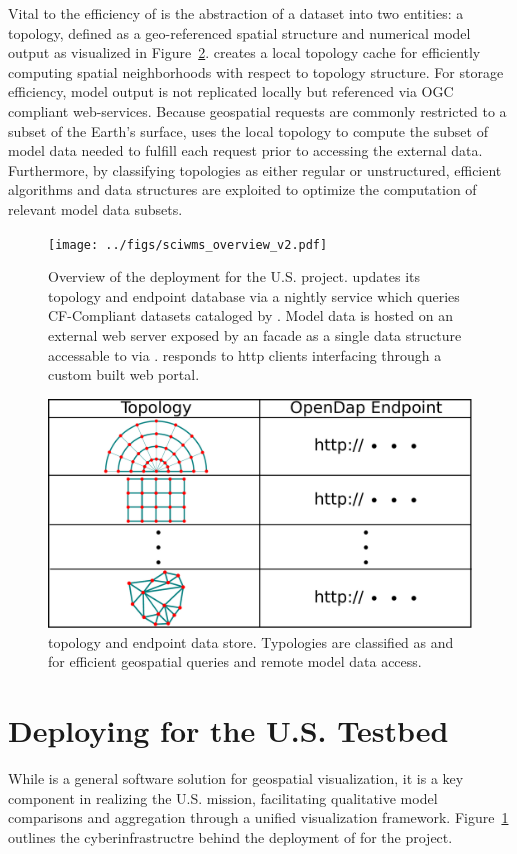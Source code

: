 Vital to the efficiency of \sciwms{} is the abstraction
of a dataset into two entities: a topology, defined as
a geo-referenced spatial structure and numerical model output as
visualized in Figure~\ref{fig:sciwms_topology_endpoints}. \Sciwms{}
creates a local topology cache for efficiently computing spatial
neighborhoods with respect to topology structure.  For storage
efficiency, model output is not replicated locally but referenced via
OGC compliant web-services. Because geospatial \wms{} requests are
commonly restricted to a subset of the Earth's surface, \sciwms{} uses
the local topology to compute the subset of model data needed to
fulfill each request prior to accessing the external
data. Furthermore, by classifying topologies as either regular or
unstructured, efficient algorithms and data structures are exploited
to optimize the computation of relevant model data subsets.
\begin{figure}[ht!]
  \centering
  \texttt{[image: ../figs/sciwms\_overview\_v2.pdf]}
  \caption{Overview of the \sciwms{} deployment for the U.S. \ioos{}
    \comt{} project. \Sciwms{} updates its topology and endpoint
    database via a nightly service which queries CF-Compliant datasets
    cataloged by \ngdc{}. Model data is hosted on an external web server
    exposed by an \ncml{} facade as a single \netcdf{} data structure
    accessable to \sciwms{} via \opendap{}. \Sciwms{} responds to http
    clients interfacing through a custom built web portal.}
  \label{fig:overview1}
\end{figure}
\begin{figure}[ht!]
  \centering
  \includegraphics[width=0.6\columnwidth]{../figs/sciwms_db_topology_endpoints.pdf}
  \caption{\Sciwms{} topology and endpoint data store. Typologies are
    classified as \cgrid{} and \ugrid{} for efficient geospatial
    queries and remote model data access.}
  \label{fig:sciwms_topology_endpoints}
\end{figure}
\section{Deploying \sciwms{} for the U.S. \ioos{} \comt{} Testbed}
While \sciwms{} is a general software solution for geospatial
visualization, it is a key component in realizing the U.S. \ioos{}
\comt{} mission, facilitating qualitative model comparisons and
aggregation through a unified visualization
framework. Figure~\ref{fig:overview1} outlines the cyberinfrastructre
behind the deployment of \sciwms{} for the \comt{} project.

